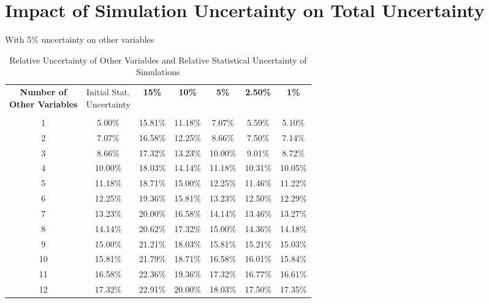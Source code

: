 \chapter{Impact of Simulation Uncertainty on Total Uncertainty}\label{app:f}

With 5\% uncertainty on other variables
\begin{table}[h]
    \centering
    \begin{tabular}{c|cccccc}
        \headercell{\textbf{Number of} \\ \textbf{Other Variables}} & \headercell{Initial Stat. \\ Uncertainty} & \textbf{15\%} & \textbf{10\%} & \textbf{5\%} & \textbf{2.50\%} & \textbf{1\%} \\ \\ \hline
        1 & 5.00\% & 15.81\% & 11.18\% & 7.07\% & 5.59\% & 5.10\% \\
        2 & 7.07\% & 16.58\% & 12.25\% & 8.66\% & 7.50\% & 7.14\% \\
        3 & 8.66\% & 17.32\% & 13.23\% & 10.00\% & 9.01\% & 8.72\% \\
        4 & 10.00\% & 18.03\% & 14.14\% & 11.18\% & 10.31\% & 10.05\% \\
        5 & 11.18\% & 18.71\% & 15.00\% & 12.25\% & 11.46\% & 11.22\% \\
        6 & 12.25\% & 19.36\% & 15.81\% & 13.23\% & 12.50\% & 12.29\% \\
        7 & 13.23\% & 20.00\% & 16.58\% & 14.14\% & 13.46\% & 13.27\% \\
        8 & 14.14\% & 20.62\% & 17.32\% & 15.00\% & 14.36\% & 14.18\% \\
        9 & 15.00\% & 21.21\% & 18.03\% & 15.81\% & 15.21\% & 15.03\% \\
        10 & 15.81\% & 21.79\% & 18.71\% & 16.58\% & 16.01\% & 15.84\% \\
        11 & 16.58\% & 22.36\% & 19.36\% & 17.32\% & 16.77\% & 16.61\% \\
        12 & 17.32\% & 22.91\% & 20.00\% & 18.03\% & 17.50\% & 17.35\% \\
    \end{tabular}
    \caption{Relative Uncertainty of Other Variables and Relative Statistical Uncertainty of Simulations}
    \label{table:uncertainties}
\end{table}




